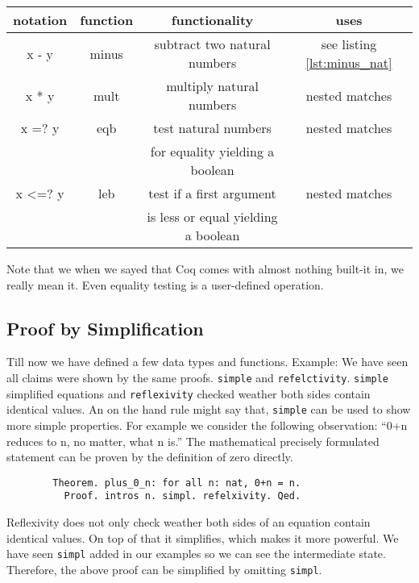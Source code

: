    \begin{center}
   \begin{tabular}{|c|c|c|c|}
     \hline 
 	  notation      & function        & functionality                       & uses           \\  \hline
 	  x - y         & minus           & subtract two natural numbers       & see listing  \ref{lst:minus_nat} \\  \hline
      x * y         & mult            & multiply natural numbers            & nested matches \\  \hline   
   	  x =? y        & eqb             & test natural numbers                & nested matches \\  
  	                &                 & for equality yielding a boolean     &                \\  \hline
   	  x <=? y       & leb             & test if a first argument            & nested matches \\  
   	                &                 & is less or equal yielding a boolean &                \\  \hline
   \end{tabular}
   \end{center}
	Note that we when we sayed that Coq comes with almost nothing built-it in, we really mean it.
    Even equality testing is a user-defined operation.
    
    
        
   \subsection{Proof by Simplification}
   
   
   Till now we have defined a few data types and functions.
   Example: We have seen all claims were shown by the same proofs. \lstinline!simple! and \lstinline!refelctivity!. 
   \lstinline!simple! simplified equations and \lstinline!reflexivity! checked weather both sides contain identical values.
   An on the hand rule might say that, \lstinline!simple! can be used to show more simple properties.
   For example we consider the following observation: ``0+n reduces to n, no matter, what n is.''
   The mathematical precisely formulated statement can be proven by the definition of zero directly.
   
   \begin{example}
	   \begin{theorem}
  	   \begin{lstlisting}
   		Theorem. plus_0_n: for all n: nat, 0+n = n.
   		  Proof. intros n. simpl. refelxivity. Qed.
    	\end{lstlisting}	
	\end{theorem}
	\end{example}              
    \begin{remark}
    	Reflexivity does not only check weather both sides of an equation contain identical values. 
    	On top of that it simplifies, which makes it more powerful. 
    	We have seen \lstinline!simpl! added in our examples so we can see the intermediate state.
    	Therefore, the above proof can be simplified by omitting \lstinline!simpl!. 
     \end{remark}


